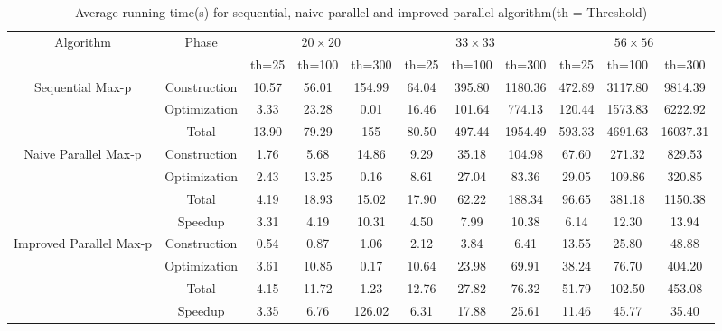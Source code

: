\documentclass[conference]{IEEEtran}
\begin{document}
\begin{table}[!htbp]
\begin{center}
\begin{tabular}{|c|c|c|c|c|c|c|c|c|c|c|}
\hline 
\multirow{2}{*}{Algorithm}&\multirow{2}{*}{Phase} & \multicolumn{3}{|c|}{$20\times 20$} & \multicolumn{3}{|c|}{$33\times33$} & \multicolumn{3}{|c|}{$56\times56$}\\
\cline{3-11}
	& & th=25 & th=100 & th=300  & th=25 & th=100 & th=300  & th=25 & th=100 & th=300\\
\cline{1-11}
\multirow{3}{*}{Sequential Max-p}& Construction  & 10.57& 56.01 & 154.99 & 64.04 & 395.80 &1180.36 &472.89 &3117.80 &9814.39 \\
\cline{2-11}
 & Optimization& 3.33 & 23.28 & 0.01 & 16.46 & 101.64 &774.13 &120.44 &1573.83 &6222.92 \\
\cline{2-11}
 & Total& 13.90 & 79.29 & 155 & 80.50 & 497.44 &1954.49 &593.33 &4691.63 &16037.31\\
\hline
\hline

\multirow{4}{*}{Naive Parallel Max-p}  &Construction& 1.76& 5.68 & 14.86 & 9.29 & 35.18 &104.98 &67.60 &271.32 &829.53\\
\cline{2-11}
 & Optimization& 2.43 & 13.25 & 0.16 & 8.61 & 27.04 &83.36 &29.05 &109.86&320.85 \\
\cline{2-11}
 & Total& 4.19 & 18.93 & 15.02 & 17.90 & 62.22 &188.34 &96.65 &381.18&1150.38 \\
\cline{2-11}
 & Speedup& 3.31 & 4.19 & 10.31 & 4.50 & 7.99 &10.38 &6.14 &12.30 &13.94\\
\hline
\hline

\multirow{4}{*}{Improved Parallel Max-p} &Construction & 0.54& 0.87 & 1.06 & 2.12 & 3.84 &6.41 &13.55 &25.80&48.88 \\
\cline{2-11}
 & Optimization& 3.61 & 10.85 & 0.17 & 10.64 &23.98 &69.91 &38.24&76.70 & 404.20 \\
\cline{2-11}
 & Total& 4.15 & 11.72 & 1.23 & 12.76 &27.82 &76.32 &51.79 &102.50 & 453.08\\
\cline{2-11}
 & Speedup& 3.35 & 6.76 & 126.02 & 6.31 & 17.88 &25.61 &11.46 &45.77 &35.40\\
\hline


\end{tabular}
\caption{Average running time(s) for sequential, naive parallel and improved parallel algorithm(th = Threshold)}
\label{tab:tab4}
\end{center}
\end{table}
\end{document}
